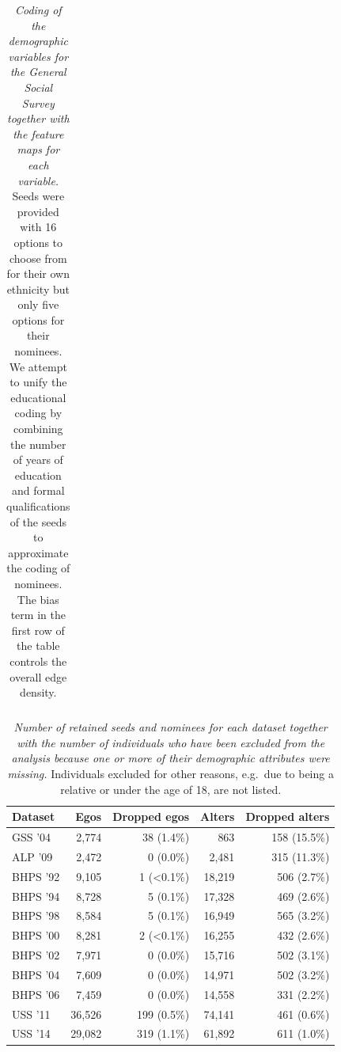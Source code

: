 \documentclass{scrartcl}
\newcommand{\titlecaption}[2]{\caption[#1]{\emph{#1} #2}}
\begin{document}
\begin{table}
\begin{tabularx}{\columnwidth}{lXXc}
        \bottomrule %
    \end{tabularx}
    \titlecaption{Coding of the demographic variables for the General Social Survey together with the feature maps for each variable.}{Seeds were provided with 16 options to choose from for their own ethnicity but only five options for their nominees. We attempt to unify the educational coding by combining the number of years of education and formal qualifications of the seeds to approximate the coding of nominees. The bias term in the first row of the table controls the overall edge density.\label{tbl:survey-gss-coding}}
\end{table}

\begin{table}
    \begin{tabularx}{\columnwidth}{lrrrr}
        \toprule %
        Dataset & Egos & Dropped egos & Alters & Dropped alters \\
        \midrule %
        GSS '04 & 2,774 & 38 (1.4\%) & 863 & 158 (15.5\%)\\
        ALP '09 & 2,472 & 0 (0.0\%) & 2,481 & 315 (11.3\%)\\
        BHPS '92 & 9,105 & 1 (\textless 0.1\%) & 18,219 & 506 (2.7\%)\\
        BHPS '94 & 8,728 & 5 (0.1\%) & 17,328 & 469 (2.6\%)\\
        BHPS '98 & 8,584 & 5 (0.1\%) & 16,949 & 565 (3.2\%)\\
        BHPS '00 & 8,281 & 2 (\textless 0.1\%) & 16,255 & 432 (2.6\%)\\
        BHPS '02 & 7,971 & 0 (0.0\%) & 15,716 & 502 (3.1\%)\\
        BHPS '04 & 7,609 & 0 (0.0\%) & 14,971 & 502 (3.2\%)\\
        BHPS '06 & 7,459 & 0 (0.0\%) & 14,558 & 331 (2.2\%)\\
        USS '11 & 36,526 & 199 (0.5\%) & 74,141 & 461 (0.6\%)\\
        USS '14 & 29,082 & 319 (1.1\%) & 61,892 & 611 (1.0\%)\\
        \bottomrule %
    \end{tabularx}
    \titlecaption{Number of retained seeds and nominees for each dataset together with the number of individuals who have been excluded from the analysis because one or more of their demographic attributes were missing.}{Individuals excluded for other reasons, e.g.\ due to being a relative or under the age of 18, are not listed.\label{tbl:survey-sample-size}}
\end{table}
\end{document}

